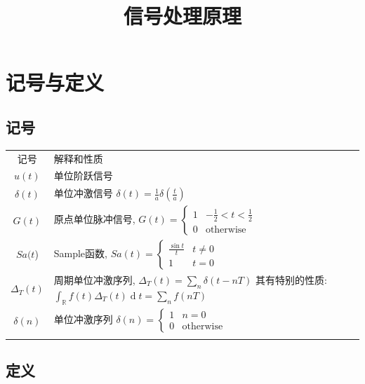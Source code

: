 \documentclass{ctexart}
\title{信号处理原理}
\DeclareMathOperator{\ud}{\mathrm{d}}
\DeclareMathOperator{\Rset}{\mathbb{R}}
\newlength{\Oldarrayrulewidth}
\newcommand{\Hline}[1]{
  \noalign{\global\setlength{\Oldarrayrulewidth}{\arrayrulewidth}}
  \noalign{\global\setlength{\arrayrulewidth}{#1}}\hline
  \noalign{\global\setlength{\arrayrulewidth}{\Oldarrayrulewidth}}}
\newcommand{\Topline}{\Hline{0.08em}}
\newcommand{\Bottomline}{\Hline{0.08em}}
\newcommand{\Midline}{\Hline{0.05em}}
\begin{document}
\maketitle

\tableofcontents

\section{记号与定义}
\subsection{记号}
    \begin{table}[ht!]
        \centering
        \begin{tabularx}{\textwidth}{|c|L|}
            \Topline
            记号 & 解释和性质 \\ \Midline
            $u(t)$ & 单位阶跃信号\\ \Midline
            $\delta(t)$ & 单位冲激信号 $\delta(t) = \frac{1}{a} \delta(\frac{t}{a})$ \\ \Midline
            $G(t)$ & 原点单位脉冲信号, $G(t) = \begin{cases}
                1 & -\frac{1}{2} < t < \frac{1}{2}\\
                0 & \text{otherwise} \end{cases}$
                \\ \Midline
            $Sa(t$) & Sample函数, $Sa(t) = \begin{cases}
                \frac{\sin t}{t} & t \neq 0 \\
                1 & t = 0 \end{cases}$ \\ \Midline
            $\Delta_{T} (t)$ & 周期单位冲激序列, $\Delta_T(t) = \sum_{n} \delta(t - n T)$\newline
                其有特别的性质: $\int_{\Rset} f(t) \Delta_T(t) \ud t = \sum_n f(nT)$
            \\ \Midline
            $\delta(n)$ & 单位冲激序列 $\delta(n) = \begin{cases}1 & n = 0 \\ 0 & \text{otherwise}\end{cases}$ \\ \Bottomline
        \end{tabularx}
    \end{table}

\subsection{定义}
\end{document}
